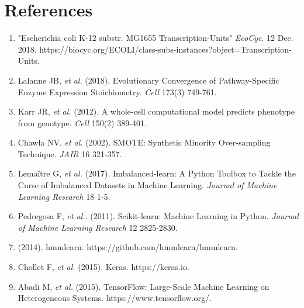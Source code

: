 \documentclass{article}
\begin{document}
\section*{References}
\small
\begin{enumerate}
\item\label{itm:ecocyc}
"Escherichia coli K-12 substr. MG1655 Transcription-Units" \textit{EcoCyc}. 12 Dec. 2018. https://biocyc.org/ECOLI/class-subs-instances?object=Transcription-Units.

\item\label{itm:lalanne}
Lalanne JB, \textit{et al.} (2018). Evolutionary Convergence of Pathway-Specific Enzyme Expression Stoichiometry. \textit{Cell} 173(3) 749-761.

\item\label{itm:karr}
Karr JR, \textit{et al.} (2012). A whole-cell computational model predicts phenotype from genotype. \textit{Cell} 150(2) 389-401.

\item\label{itm:smote}
Chawla NV, \textit{et al.} (2002). SMOTE: Synthetic Minority Over-sampling Technique. \textit{JAIR} 16
321-357.

\item\label{itm:imblearn}
Lema{{\^i}}tre G, \textit{et al.} (2017). Imbalanced-learn: A Python Toolbox to Tackle the Curse of Imbalanced Datasets in Machine Learning. \textit{Journal of Machine Learning Research} 18 1-5.

\item\label{itm:sklearn}
Pedregosa F, \textit{et al.}. (2011). Scikit-learn: Machine Learning in Python. \textit{Journal of Machine Learning Research} 12 2825-2830.

\item\label{itm:hmmlearn}
(2014). hmmlearn. https://github.com/hmmlearn/hmmlearn.

\item\label{itm:keras}
Chollet F, \textit{et al.} (2015). Keras. https://keras.io.

\item\label{itm:tf}
Abadi M, \textit{et al.} (2015). TensorFlow: Large-Scale Machine Learning on Heterogeneous Systems. https://www.tensorflow.org/.

\end{enumerate}
\end{document}
